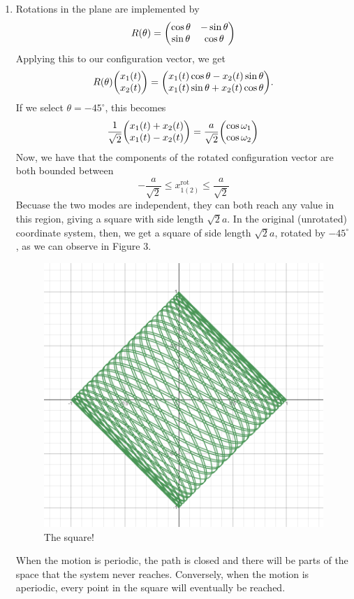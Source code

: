 \documentclass[12pt]{article}
\begin{document}
\begin{enumerate}[label=\roman*.]
    \item Rotations in the plane are implemented by
    \[ R(\theta) = \mqty(\cos\theta & -\sin\theta \\ \sin\theta & \cos\theta) \]
    Applying this to our configuration vector, we get
    \[ R(\theta)\mqty(x_1(t)\\x_2(t)) = \mqty(x_1(t)\cos\theta - x_2(t)\sin\theta \\ x_1(t)\sin\theta + x_2(t)\cos\theta). \]
    If we select $\theta = -45^\circ$, this becomes
    \[ \frac{1}{\sqrt{2}}\mqty(x_1(t) + x_2(t) \\ x_1(t) - x_2(t)) = \frac{a}{\sqrt{2}}\mqty(\cos\omega_1 \\ \cos\omega_2) \]
    Now, we have that the components of the rotated configuration vector are both bounded between
    \[ -\frac{a}{\sqrt{2}} \leq x_{1(2)}^{\text{rot}} \leq \frac{a}{\sqrt{2}} \]
    Becuase the two modes are independent, they can both reach any value in this region, giving a square with side length $\sqrt{2}a$. In the original (unrotated) coordinate system, then, we get a square of side length $\sqrt{2}a$, rotated by $-45^\circ$, as we can observe in Figure 3.
    \begin{figure}[H]
        \includegraphics[scale=.2]{fig3}
        \centering
        \caption{The square!}
        \label{fig3}
    \end{figure}

    When the motion is periodic, the path is closed and there will be parts of the space that the system never reaches. Conversely, when the motion is aperiodic, every point in the square will eventually be reached.


\end{enumerate}
\end{document}
